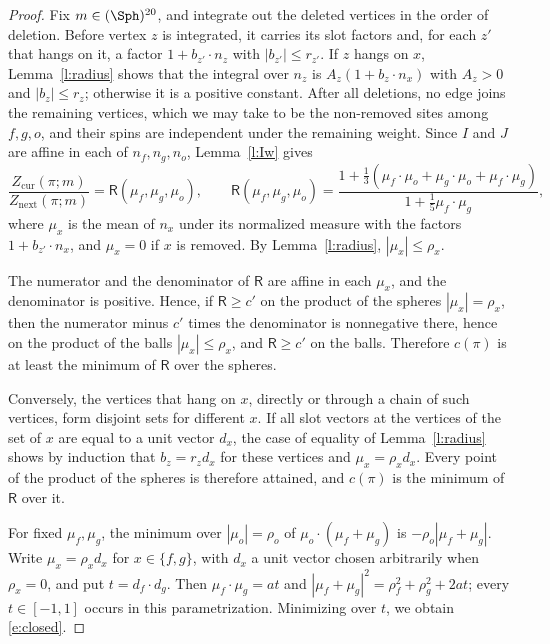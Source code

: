\begin{proof}
Fix $m \in (\Sph)^{20}$, and integrate out the deleted vertices in the order of deletion. Before vertex $z$ is integrated, it carries its slot factors and, for each $z'$ that hangs on it, a factor $1 + b_{z'} \cdot n_z$ with $|b_{z'}| \le r_{z'}$. If $z$ hangs on $x$, Lemma~\ref{l:radius} shows that the integral over $n_z$ is $A_z (1 + b_z \cdot n_x)$ with $A_z > 0$ and $|b_z| \le r_z$; otherwise it is a positive constant. After all deletions, no edge joins the remaining vertices, which we may take to be the non-removed sites among $f, g, o$, and their spins are independent under the remaining weight. Since $I$ and $J$ are affine in each of $n_f, n_g, n_o$, Lemma~\ref{l:Iw} gives
\begin{equation}\label{e:Rmu}
\frac{Z_{\mathrm{cur}}(\pi; m)}{Z_{\mathrm{next}}(\pi; m)} = \mathsf R(\mu_f, \mu_g, \mu_o), \qquad \mathsf R(\mu_f, \mu_g, \mu_o) = \frac{1 + \frac13 (\mu_f \cdot \mu_o + \mu_g \cdot \mu_o + \mu_f \cdot \mu_g)}{1 + \frac15 \mu_f \cdot \mu_g} ,
\end{equation}
where $\mu_x$ is the mean of $n_x$ under its normalized measure with the factors $1 + b_{z'} \cdot n_x$, and $\mu_x = 0$ if $x$ is removed. By Lemma~\ref{l:radius}, $|\mu_x| \le \rho_x$.

The numerator and the denominator of $\mathsf R$ are affine in each $\mu_x$, and the denominator is positive. Hence, if $\mathsf R \ge c'$ on the product of the spheres $|\mu_x| = \rho_x$, then the numerator minus $c'$ times the denominator is nonnegative there, hence on the product of the balls $|\mu_x| \le \rho_x$, and $\mathsf R \ge c'$ on the balls. Therefore $c(\pi)$ is at least the minimum of $\mathsf R$ over the spheres.

Conversely, the vertices that hang on $x$, directly or through a chain of such vertices, form disjoint sets for different $x$. If all slot vectors at the vertices of the set of $x$ are equal to a unit vector $d_x$, the case of equality of Lemma~\ref{l:radius} shows by induction that $b_z = r_z d_x$ for these vertices and $\mu_x = \rho_x d_x$. Every point of the product of the spheres is therefore attained, and $c(\pi)$ is the minimum of $\mathsf R$ over it.

For fixed $\mu_f, \mu_g$, the minimum over $|\mu_o| = \rho_o$ of $\mu_o \cdot (\mu_f + \mu_g)$ is $-\rho_o |\mu_f + \mu_g|$. Write $\mu_x = \rho_x d_x$ for $x \in \{f,g\}$, with $d_x$ a unit vector chosen arbitrarily when $\rho_x = 0$, and put $t = d_f \cdot d_g$. Then $\mu_f \cdot \mu_g = at$ and $|\mu_f + \mu_g|^2 = \rho_f^2 + \rho_g^2 + 2at$; every $t \in [-1,1]$ occurs in this parametrization. Minimizing over $t$, we obtain \eqref{e:closed}.


\end{proof}
